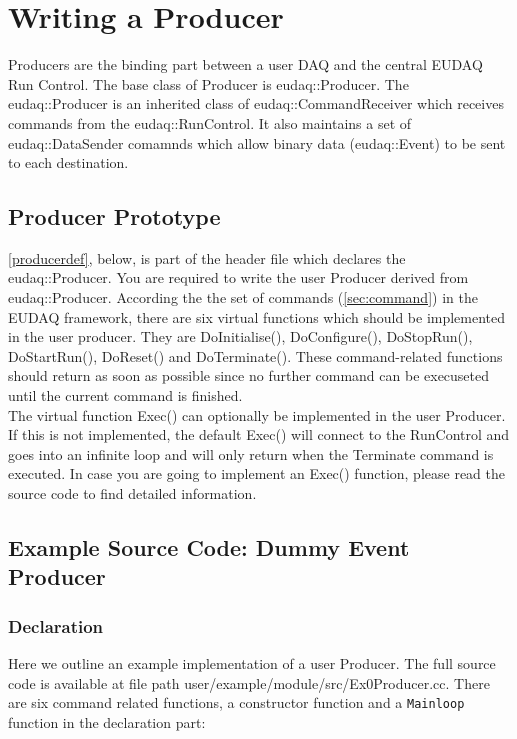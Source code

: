 \section{Writing a Producer}\label{sec:ProducerWriting}
Producers are the binding part between a user DAQ and the central EUDAQ Run Control. The base class of Producer is eudaq::Producer. The eudaq::Producer is an inherited class of eudaq::CommandReceiver which receives commands from the eudaq::RunControl. It also maintains a set of eudaq::DataSender comamnds which allow binary data (eudaq::Event) to be sent to each destination.\\

\subsection{Producer Prototype}\label{sec:Producer_hh}

\autoref{producerdef}, below, is part of the header file which declares the eudaq::Producer. You are required to write the user Producer derived from eudaq::Producer. According the the set of commands (\autoref{sec:command}) in the EUDAQ framework, there are six virtual functions which should be implemented in the user producer. They are DoInitialise(), DoConfigure(), DoStopRun(), DoStartRun(), DoReset() and DoTerminate(). These command-related functions should return as soon as possible since no further command can be execuseted until the current command is finished. \\



The virtual function Exec() can optionally be implemented in the user Producer. If this is not implemented, the default Exec() will connect to the RunControl and goes into an infinite loop and will only return when the Terminate command is executed. In case you are going to implement an Exec() function, please read the source code to find detailed information.

\subsection{Example Source Code: Dummy Event Producer}\label{sec:Ex0Producer_cc}
\subsubsection{Declaration}
Here we outline an example implementation of a user Producer. The full source code is available at file path user/example/module/src/Ex0Producer.cc. There are six command related functions, a constructor function and a \texttt{Mainloop} function in the declaration part: \\

